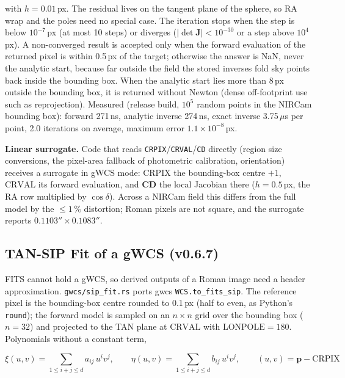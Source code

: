 \documentclass[11pt,a4paper]{article}
\newcommand{\code}[1]{\texttt{\small #1}}
\newcommand{\mat}[1]{\mathbf{#1}}
\begin{document}
    with $h = 0.01$\,px. The residual lives on the tangent plane of the sphere, so RA wrap and the poles need no special case. The iteration stops when the step is below $10^{-7}$\,px (at most 10 steps) or diverges ($|\det \mat{J}| < 10^{-30}$ or a step above $10^4$\,px). A non-converged result is accepted only when the forward evaluation of the returned pixel is within 0.5\,px of the target; otherwise the answer is NaN, never the analytic start, because far outside the field the stored inverses fold sky points back inside the bounding box. When the analytic start lies more than 8\,px outside the bounding box, it is returned without Newton (dense off-footprint use such as reprojection). Measured (release build, $10^5$ random points in the NIRCam bounding box): forward 271\,ns, analytic inverse 274\,ns, exact inverse 3.75\,$\mu$s per point, 2.0 iterations on average, maximum error $1.1 \times 10^{-8}$\,px.

    \textbf{Linear surrogate.} Code that reads \code{CRPIX}/\code{CRVAL}/\code{CD} directly (region size conversions, the pixel-area fallback of photometric calibration, orientation) receives a surrogate in gWCS mode: $\text{CRPIX}$ the bounding-box centre $+1$, $\text{CRVAL}$ its forward evaluation, and $\mat{CD}$ the local Jacobian there ($h = 0.5$\,px, the RA row multiplied by $\cos\delta$). Across a NIRCam field this differs from the full model by the $\le 1\,\%$ distortion; Roman pixels are not square, and the surrogate reports $0.1103'' \times 0.1083''$.

    \subsection{TAN-SIP Fit of a gWCS (v0.6.7)}
    \label{sec:sipfit_math}

    FITS cannot hold a gWCS, so derived outputs of a Roman image need a header approximation. \code{gwcs/sip\_fit.rs} ports gwcs \code{WCS.to\_fits\_sip}. The reference pixel is the bounding-box centre rounded to 0.1\,px (half to even, as Python's \code{round}); the forward model is sampled on an $n \times n$ grid over the bounding box ($n = 32$) and projected to the TAN plane at $\text{CRVAL}$ with $\text{LONPOLE} = 180$. Polynomials without a constant term,

    \begin{equation}
        \xi(u, v) = \sum_{1 \le i+j \le d} a_{ij}\, u^i v^j, \qquad \eta(u, v) = \sum_{1 \le i+j \le d} b_{ij}\, u^i v^j, \qquad (u, v) = \mathbf{p} - \text{CRPIX}
    \end{equation}
\end{document}
